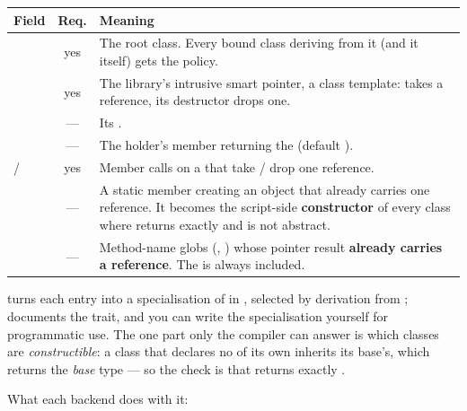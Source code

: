 \begin{center}
\small
\begin{tabular}{@{}lcL{8.8cm}@{}}
\toprule
\textbf{Field} & \textbf{Req.} & \textbf{Meaning} \\
\midrule
{} & yes & The root class. Every bound class deriving from it (and it
  itself) gets the policy. \\
 & yes & The library's intrusive smart pointer, a class template:
   takes a reference, its destructor drops one. \\
 & --- & Its . \\
 & --- & The holder's member returning the  (default
  ). \\
 /  & yes & Member calls on a  that take /
  drop one reference. \\
 & --- & A static member creating an object that already carries
  one reference. It becomes the script-side \textbf{constructor} of every class
  where  returns exactly  and  is not
  abstract. \\
 & --- & Method-name globs (\code{*}, ) whose
  pointer result \textbf{already carries a reference}. The  is
  always included. \\
\bottomrule
\end{tabular}
\end{center}

 turns each entry into a specialisation of
 in , selected by derivation
from ;  documents the trait, and you can
write the specialisation yourself for programmatic use. The one part only the
compiler can answer is which classes are \emph{constructible}: a class that
declares no  of its own inherits its base's, which returns the
\emph{base} type --- so the check is that  returns exactly
.

What each backend does with it:

